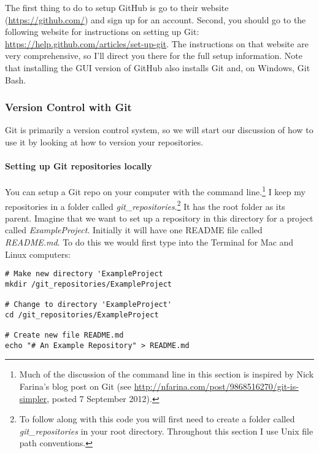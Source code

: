 The first thing to do to setup GitHub is go to their website (\url{https://github.com/}) and sign up for an account. Second, you should go to the following website for instructions on setting up Git: \url{https://help.github.com/articles/set-up-git}. The instructions on that website are very comprehensive, so I'll direct you there for the full setup information. Note that installing the GUI version of GitHub also installs Git and, on Windows, Git Bash. 

\subsubsection{Version Control with Git}

Git is primarily a version control system, so we will start our discussion of how to use it by looking at how to version your repositories.

\paragraph{Setting up Git repositories locally}

You can setup a Git repo on your computer with the command line.\footnote{Much of the discussion of the command line in this section is inspired by Nick Farina's blog post on Git (see \url{http://nfarina.com/post/9868516270/git-is-simpler}, posted 7 September 2012).} I keep my repositories in a folder called {\emph{git\_repositories}}.\footnote{To follow along with this code you will first need to create a folder called {\emph{git\_repositories}} in your root directory. Throughout this section I use Unix file path conventions.} It has the root folder as its parent. Imagine that we want to set up a repository in this directory for a project called {\emph{ExampleProject}}. Initially it will have one README file called {\emph{README.md}}. To do this we would first type into the Terminal for Mac and Linux computers:

\begin{knitrout}
\color{fgcolor}\begin{kframe}
\begin{verbatim}
# Make new directory 'ExampleProject
mkdir /git_repositories/ExampleProject

# Change to directory 'ExampleProject'
cd /git_repositories/ExampleProject

# Create new file README.md
echo "# An Example Repository" > README.md
\end{verbatim}
\end{kframe}
\end{knitrout}


